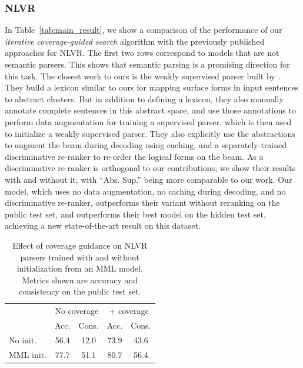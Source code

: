 \subsubsection{NLVR}
In Table~\ref{tab:main_result}, we show a comparison of the performance of our
\textit{iterative coverage-guided search} algorithm with the previously
published approaches for NLVR\@. The first two rows correspond to models that are
not semantic parsers. This shows that semantic parsing is a promising direction
for this task. The closest work to ours is the weakly supervised parser built by
\cite{goldman2017weakly}. They build a lexicon similar to ours for mapping
surface forms in input sentences to abstract clusters. But in addition to
defining a lexicon, they also manually annotate complete sentences in this
abstract space, and use those annotations to perform data augmentation for
training a supervised parser, which is then used to initialize a weakly
supervised parser. They also explicitly use the abstractions to augment the beam
during decoding using caching, and a separately-trained discriminative re-ranker
to re-order the logical forms on the beam.  As a discriminative re-ranker is
orthogonal to our contributions, we show their results with and without it, with
``Abs. Sup.'' being more comparable to our work. Our model, which uses no data
augmentation, no caching during decoding, and no discriminative re-ranker,
outperforms their variant without reranking on the public test set, and
outperforms their best model on the hidden test set, achieving a new
state-of-the-art result on this dataset.

\begin{table}
	\centering
	\begin{tabular}{lcccc}
	\toprule
	\multicolumn{1}{c}{}& \multicolumn{2}{c}{No coverage} & \multicolumn{2}{c}{+ coverage} \\
	\multicolumn{1}{c}{}& Acc. & Cons. & Acc. & Cons. \\
	\midrule
	No init.  & 56.4 & 12.0 & 73.9 & 43.6 \\
	MML init. & 77.7 & 51.1 & 80.7 & 56.4 \\
	\bottomrule
	\end{tabular}
	\caption{Effect of coverage guidance on NLVR parsers trained with and without initialization from an MML model. Metrics shown are accuracy and consistency on the public test set.}\label{tab:coverage_guidance}
\end{table}


